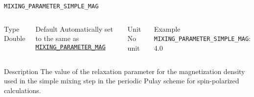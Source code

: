 \documentclass[xcolor=dvipsnames,t]{beamer}
\begin{document}
\begin{frame}[allowframebreaks]{\texttt{MIXING\_PARAMETER\_SIMPLE\_MAG}} \label{MIXING_PARAMETER_SIMPLE_MAG}
\vspace*{-12pt}
\begin{columns}
\begin{block}{Type}
Double
\end{block}

\begin{block}{Default}
Automatically set to the same as \hyperlink{MIXING_PARAMETER_MAG}{\texttt{MIXING\_PARAMETER\_MAG}}
\end{block}

\begin{block}{Unit}
No unit
\end{block}

\begin{block}{Example}
\texttt{MIXING\_PARAMETER\_SIMPLE\_MAG}: 4.0
\end{block}
\end{columns}

\begin{block}{Description}
The value of the relaxation parameter for the magnetization density used in the simple mixing step in the periodic Pulay scheme for spin-polarized calculations.
\end{block}

\end{frame}
\end{document}
